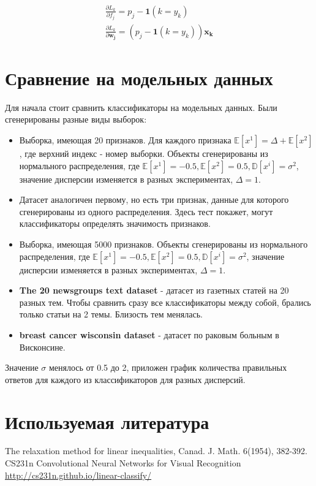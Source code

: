 \documentclass[a4paper]{article}
\newcommand{\xk}{\bm{x_k}}
\newcommand{\E}{\mathbb{E}}
\begin{document}
\begin{eqnarray}
\frac{\partial L_k}{\partial f_j} = p_j - \bm{1}(k = y_k) \\
\frac{\partial L_k}{\partial \bm{w_j}} = \left(p_j - \bm{1}(k = y_k)\right) \xk
\end{eqnarray}


\section{Сравнение на модельных данных}

Для начала стоит сравнить классификаторы на модельных данных. Были сгенерированы разные виды выборок:
\begin{itemize}
\item Выборка, имеющая 20 признаков. Для каждого признака $\E[x^1] = \Delta + \E[x^2]$, где верхний индекс - номер выборки. Объекты сгенерированы из нормального распределения, где $\E[x^1] = -0.5, \E[x^2] = 0.5, \mathbb{D}[x^i] = \sigma^2$, значение дисперсии изменяется в разных экспериментах, $\Delta = 1$.
\item Датасет аналогичен первому, но есть три признак, данные для которого сгенерированы из одного распределения. Здесь тест покажет, могут классификаторы определять значимость признаков.
\item Выборка, имеющая 5000 признаков.  Объекты сгенерированы из нормального распределения, где $\E[x^1] = -0.5, \E[x^2] = 0.5, \mathbb{D}[x^i] = \sigma^2$, значение дисперсии изменяется в разных экспериментах, $\Delta = 1$.
\item \textbf{The 20 newsgroups text dataset} - датасет из газетных статей на 20 разных тем. Чтобы сравнить сразу все классификаторы между собой, брались только статьи на 2 темы. Близость тем менялась.
\item \textbf{breast cancer wisconsin dataset} - датасет по раковым больным в Висконсине.
\end{itemize}
Значение $\sigma$ менялось от 0.5 до 2, приложен график количества правильных ответов для каждого из классификаторов для разных дисперсий.

\newpage
\section{Используемая литература}
\begin{thebibliography}{99}
 The relaxation method for linear inequalities, Canad. J. Math. 6(1954), 382-392.
 CS231n Convolutional Neural Networks for Visual Recognition \url{http://cs231n.github.io/linear-classify/}
\end{thebibliography}
\end{document}
